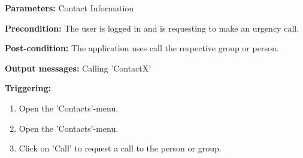 \begin{description}

\item \textbf{Parameters:} Contact Information
\item \textbf{Precondition:} The user is logged in and is requesting to make an urgency call.
\item \textbf{Post-condition:} The application uses call the respective group or person.
\item \textbf{Output messages:} Calling 'ContactX'

\item \textbf{Triggering:}
\begin{enumerate}
\item Open the 'Contacts'-menu.
\item Open the 'Contacts'-menu.
\item Click on 'Call' to request a call to the person or group.
\end{enumerate}
\end{description} 



